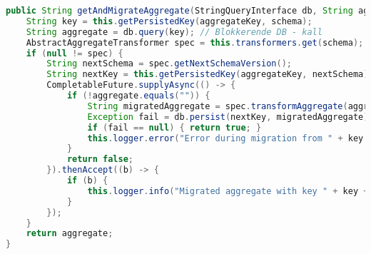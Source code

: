 \begin{lstlisting}[language=Java, caption={Metode for håndtering av GET-spørring i Migrator.}]
public String getAndMigrateAggregate(StringQueryInterface db, String aggregateKey, String schema) {
    String key = this.getPersistedKey(aggregateKey, schema);
    String aggregate = db.query(key); // Blokkerende DB - kall
    AbstractAggregateTransformer spec = this.transformers.get(schema);
    if (null != spec) {
        String nextSchema = spec.getNextSchemaVersion();
        String nextKey = this.getPersistedKey(aggregateKey, nextSchema);
        CompletableFuture.supplyAsync(() -> {
            if (!aggregate.equals("")) {
                String migratedAggregate = spec.transformAggregate(aggregate);
                Exception fail = db.persist(nextKey, migratedAggregate);
                if (fail == null) { return true; }
                this.logger.error("Error during migration from " + key + " to " + nextKey + ":\n"+ fail.toString());
            }
            return false;
        }).thenAccept((b) -> {
            if (b) {
                this.logger.info("Migrated aggregate with key " + key + " to " + nextKey);
            }
        });
    }
    return aggregate;
}
\end{lstlisting}
